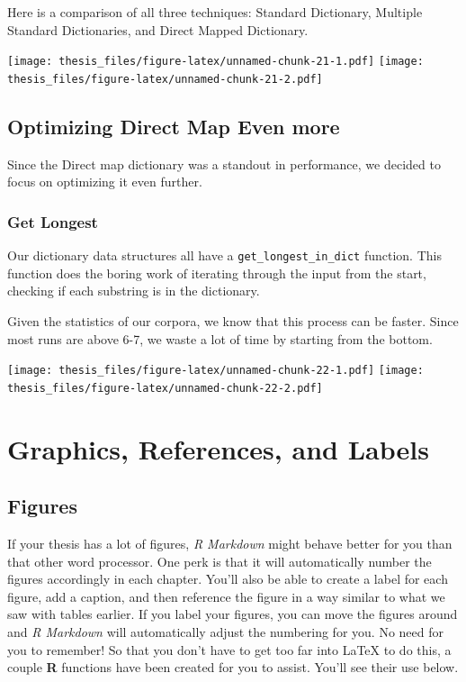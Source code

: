 \documentclass[12pt,twoside]{reedthesis}
\begin{document}
Here is a comparison of all three techniques: Standard Dictionary, Multiple Standard Dictionaries, and Direct Mapped Dictionary.

\texttt{[image: thesis\_files/figure-latex/unnamed-chunk-21-1.pdf]} \texttt{[image: thesis\_files/figure-latex/unnamed-chunk-21-2.pdf]}

\hypertarget{optimizing-direct-map-even-more}{%
\section{Optimizing Direct Map Even more}\label{optimizing-direct-map-even-more}}

Since the Direct map dictionary was a standout in performance, we decided to focus on optimizing it even further.

\hypertarget{get-longest}{%
\subsection{Get Longest}\label{get-longest}}

Our dictionary data structures all have a \texttt{get\_longest\_in\_dict} function. This function does the boring work of iterating through the input from the start, checking if each substring is in the dictionary.

Given the statistics of our corpora, we know that this process can be faster. Since most runs are above 6-7, we waste a lot of time by starting from the bottom.

\texttt{[image: thesis\_files/figure-latex/unnamed-chunk-22-1.pdf]} \texttt{[image: thesis\_files/figure-latex/unnamed-chunk-22-2.pdf]}

\hypertarget{ref-labels}{%
\chapter{Graphics, References, and Labels}\label{ref-labels}}

\hypertarget{figures}{%
\section{Figures}\label{figures}}

If your thesis has a lot of figures, \emph{R Markdown} might behave better for you than that other word processor. One perk is that it will automatically number the figures accordingly in each chapter. You'll also be able to create a label for each figure, add a caption, and then reference the figure in a way similar to what we saw with tables earlier. If you label your figures, you can move the figures around and \emph{R Markdown} will automatically adjust the numbering for you. No need for you to remember! So that you don't have to get too far into LaTeX to do this, a couple \textbf{R} functions have been created for you to assist. You'll see their use below.
\end{document}
